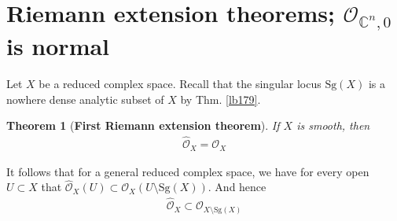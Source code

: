\documentclass[12pt,b5paper,notitlepage]{report}
\theoremstyle{definition}
\theoremstyle{plain}
\newtheorem{thm}[df]{Theorem}
\newcommand{\scr}{\mathscr}
\newcommand{\Cbb}{\mathbb C}
\newcommand{\Sg}{\mathrm{Sg}}
\newcommand{\Owht}{\widehat{\scr O}}
\numberwithin{equation}{section}
\begin{document}
\section{Riemann extension theorems; $\scr O_{\Cbb^n,0}$ is normal}



Let $X$ be a reduced complex space. Recall that the singular locus $\Sg(X)$ is a nowhere dense analytic subset of $X$ by Thm. \ref{lb179}.







\begin{thm}[\textbf{First Riemann extension theorem}]\label{lb190}
If $X$ is smooth, then
\begin{align*}
\Owht_X=\scr O_X
\end{align*}
\end{thm}

It follows that for a general reduced complex space, we have for every open $U\subset X$ that $\Owht_X(U)\subset \scr O_X(U\setminus\Sg(X))$. And hence
\begin{align}
\Owht_X\subset\scr O_{X\setminus\Sg(X)}
\end{align}
\end{document}
